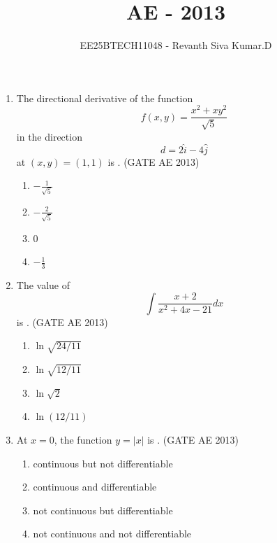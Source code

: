 \documentclass[journal,12pt,onecolumn]{IEEEtran}
\title{\LARGE \textbf{AE - 2013}}
\author{\Large EE25BTECH11048 - Revanth Siva Kumar.D}
\date{}
\theoremstyle{remark}
\begin{document}
\maketitle
\begin{flushleft}
\begin{enumerate}


\item The directional derivative of the function 
\[
f(x,y)=\frac{x^2+xy^2}{\sqrt{5}}
\] 
in the direction 
\[
d=2\hat{i}-4\hat{j}
\] 
at $(x,y)=(1,1)$ is \underline{\hspace{3cm}}.
\hfill(GATE AE 2013)

\begin{multicols}{2}
\begin{enumerate}
    \item $-\frac{1}{\sqrt{5}}$
    \item $-\frac{2}{\sqrt{5}}$
    \item $0$
    \item $-\frac{1}{3}$
\end{enumerate}
\end{multicols}

\item The value of 
\[
\int \frac{x+2}{x^2+4x-21} dx
\]
is \underline{\hspace{3cm}}.
\hfill(GATE AE 2013)

\begin{multicols}{2}
\begin{enumerate}
    \item $\ln \sqrt{24/11}$
    \item $\ln \sqrt{12/11}$
    \item $\ln \sqrt{2}$
    \item $\ln (12/11)$
\end{enumerate}
\end{multicols}

\item At $x=0$, the function $y=|x|$ is \underline{\hspace{3cm}}.
\hfill(GATE AE 2013)

\begin{enumerate}
    \item continuous but not differentiable
    \item continuous and differentiable
    \item not continuous but differentiable
    \item not continuous and not differentiable
\end{enumerate}


\end{enumerate}
\end{flushleft}
\end{document}
